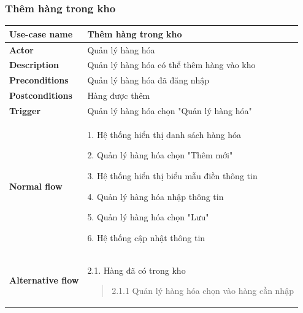         \subsubsection{Thêm hàng trong kho}
            \begin{longtable}{| p{} | p{} |} 
                \hline
                    \textbf{Use-case name} 
                & 
                    Thêm hàng trong kho
                \\
                \hline
                    \textbf{Actor} 
                & 
                    Quản lý hàng hóa
                \\
                \hline
                    \textbf{Description} 
                & 
                    Quản lý hàng hóa có thể thêm hàng vào kho
                \\
                \hline
                    \textbf{Preconditions} 
                &
                    Quản lý hàng hóa đã đăng nhập
                \\
                \hline
                    \textbf{Postconditions} 
                & 
                    Hàng được thêm
                \\
                \hline
                    \textbf{Trigger} 
                & 
                    Quản lý hàng hóa chọn "Quản lý hàng hóa"
                \\
                \hline
                \begin{flushleft}
                    \textbf{Normal flow}
                \end{flushleft}
                & 
                1. Hệ thống hiển thị danh sách hàng hóa
                    
                    2. Quản lý hàng hóa chọn "Thêm mới"
                    
                    3. Hệ thống hiển thị biểu mẫu điền thông tin
                    
                    4. Quản lý hàng hóa nhập thông tin
                    
                    5. Quản lý hàng hóa chọn "Lưu"
                    
                    6. Hệ thống cập nhật thông tin
                \\
                \hline
                \begin{flushleft}
                    \textbf{Alternative flow}
                \end{flushleft}
                &
                2.1. Hàng đã có trong kho
                    \begin{quote} 
                    2.1.1 Quản lý hàng hóa chọn vào hàng cần nhập
                        

\end{quote}
\end{longtable}
